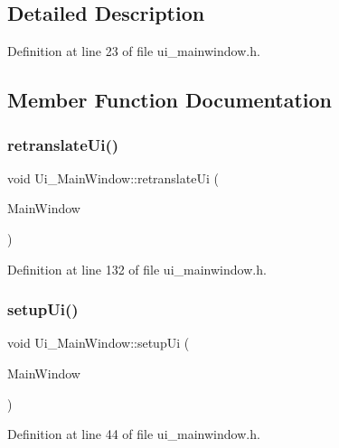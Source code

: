 \subsection{Detailed Description}


Definition at line 23 of file ui\+\_\+mainwindow.\+h.



\subsection{Member Function Documentation}
\mbox{\label{class_ui___main_window_ae4964a56cb4d6d76b7a398fd76b200e2}} 
\subsubsection{\texorpdfstring{retranslateUi()}{retranslateUi()}}
{\footnotesize\ttfamily void Ui\+\_\+\+Main\+Window\+::retranslate\+Ui (\begin{DoxyParamCaption}\item[{Q\+Widget $\ast$}]{Main\+Window }\end{DoxyParamCaption})\hspace{0.3cm}{\ttfamily [inline]}}



Definition at line 132 of file ui\+\_\+mainwindow.\+h.

\mbox{\label{class_ui___main_window_a306e3013ead511f9bc29513aa0219579}} 
\subsubsection{\texorpdfstring{setupUi()}{setupUi()}}
{\footnotesize\ttfamily void Ui\+\_\+\+Main\+Window\+::setup\+Ui (\begin{DoxyParamCaption}\item[{Q\+Widget $\ast$}]{Main\+Window }\end{DoxyParamCaption})\hspace{0.3cm}{\ttfamily [inline]}}



Definition at line 44 of file ui\+\_\+mainwindow.\+h.



